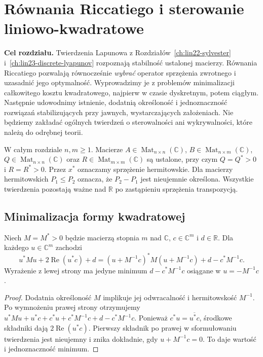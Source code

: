 \chapter{Równania Riccatiego i sterowanie liniowo-kwadratowe}
\label{ch:lin24-riccati}

\noindent\textbf{Cel rozdziału.}
Twierdzenia Lapunowa z
Rozdziałów~\ref{ch:lin22-sylvester}
i~\ref{ch:lin23-discrete-lyapunov}
rozpoznają stabilność ustalonej macierzy.
Równania Riccatiego pozwalają
równocześnie \emph{wybrać} operator
sprzężenia zwrotnego i uzasadnić
jego optymalność.
Wyprowadzimy je z problemów
minimalizacji całkowitego kosztu
kwadratowego, najpierw w czasie
dyskretnym, potem ciągłym.
Następnie udowodnimy istnienie,
dodatnią określoność i jednoznaczność
rozwiązań stabilizujących
przy jawnych, wystarczających
założeniach. Nie będziemy
zakładać ogólnych twierdzeń
o sterowalności ani wykrywalności,
które należą do odrębnej teorii.

W całym rozdziale \(n,m\ge1\).
Macierze \(A\in\operatorname{Mat}_{n\times n}(\mathbb C)\),
\(B\in\operatorname{Mat}_{n\times m}(\mathbb C)\),
\(Q\in\operatorname{Mat}_{n\times n}(\mathbb C)\)
oraz \(R\in\operatorname{Mat}_{m\times m}(\mathbb C)\)
są ustalone, przy czym
\(Q=Q^*>0\) i \(R=R^*>0\).
Przez \(x^*\) oznaczamy
sprzężenie hermitowskie.
Dla macierzy hermitowskich
\(P_1\le P_2\) oznacza,
że \(P_2-P_1\) jest
nieujemnie określona.
Wszystkie twierdzenia pozostają
ważne nad \(\mathbb R\)
po zastąpieniu sprzężenia
transpozycją.

\section{Minimalizacja formy kwadratowej}
\label{sec:lin24-square}

\begin{lemat}
\label{lem:lin24-square}
Niech \(M=M^*>0\)
będzie macierzą stopnia \(m\)
nad \(\mathbb C\),
\(c\in\mathbb C^m\)
i \(d\in\mathbb R\).
Dla każdego \(u\in\mathbb C^m\)
zachodzi
\[
 u^*Mu+2\operatorname{Re}(u^*c)+d
 =(u+M^{-1}c)^*M(u+M^{-1}c)
    +d-c^*M^{-1}c.
\]
Wyrażenie z lewej strony
ma jedyne minimum
\(d-c^*M^{-1}c\)
osiągane w \(u=-M^{-1}c\).
\end{lemat}
\begin{proof}
Dodatnia określoność \(M\)
implikuje jej odwracalność
i hermitowskość \(M^{-1}\).
Po wymnożeniu prawej strony
otrzymujemy
\(u^*Mu+u^*c+c^*u
 +c^*M^{-1}c+d-c^*M^{-1}c\).
Ponieważ \(c^*u=\overline{u^*c}\),
środkowe składniki
dają \(2\operatorname{Re}(u^*c)\).
Pierwszy składnik po prawej
w sformułowaniu twierdzenia
jest nieujemny i znika dokładnie,
gdy \(u+M^{-1}c=0\).
To daje wartość i jednoznaczność
minimum.
\end{proof}

